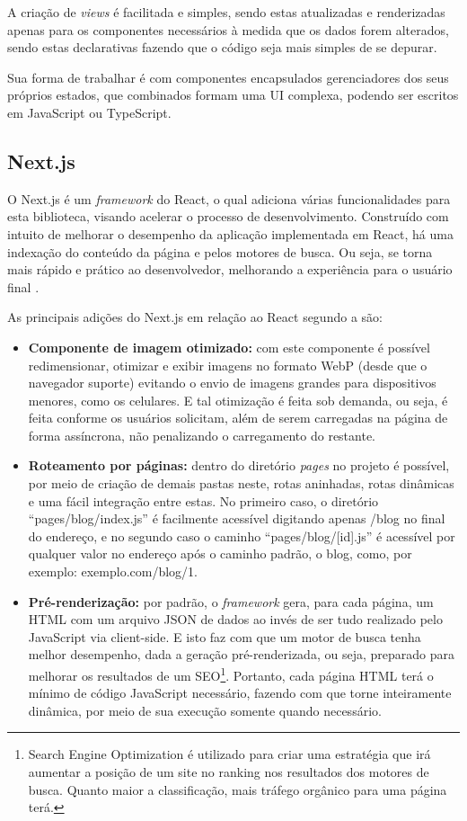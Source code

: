 A criação de \textit{views} é facilitada e simples, sendo estas atualizadas e renderizadas apenas para os componentes necessários à medida que os dados forem alterados, sendo estas declarativas fazendo que o código seja mais simples de se depurar.

Sua forma de trabalhar é com componentes encapsulados gerenciadores dos seus próprios estados, que combinados formam uma UI complexa, podendo ser escritos em JavaScript ou TypeScript.

\subsection{Next.js}
O Next.js é um \textit{framework} do React, o qual adiciona várias funcionalidades para esta biblioteca, visando acelerar o processo de desenvolvimento. Construído com intuito de melhorar o desempenho da aplicação implementada em React, há uma indexação do conteúdo da página e pelos motores de busca. Ou seja, se torna mais rápido e prático ao desenvolvedor, melhorando a experiência para o usuário final \cite{KONSHIN}.

As principais adições do Next.js em relação ao React segundo a  são:
\begin{itemize}
    \item \textbf{Componente de imagem otimizado:} com este componente é possível redimensionar, otimizar e exibir imagens no formato WebP (desde que o navegador suporte) evitando o envio de imagens grandes para dispositivos menores, como os celulares. E tal otimização é feita sob demanda, ou seja, é feita conforme os usuários solicitam, além de serem carregadas na página de forma assíncrona, não penalizando o carregamento do restante.
    \item \textbf{Roteamento por páginas:} dentro do diretório \textit{pages} no projeto é possível, por meio de criação de demais pastas neste, rotas aninhadas, rotas dinâmicas e uma fácil integração entre estas. No primeiro caso, o diretório “pages/blog/index.js” é facilmente acessível digitando apenas /blog no final do endereço, e no segundo caso o caminho “pages/blog/[id].js” é acessível por qualquer valor no endereço após o caminho padrão, o blog, como, por exemplo: exemplo.com/blog/1.
    \item \textbf{Pré-renderização:} por padrão, o \textit{framework} gera, para cada página, um HTML com um arquivo JSON de dados ao invés de ser tudo realizado pelo JavaScript via client-side. E isto faz com que um motor de busca tenha melhor desempenho, dada a geração pré-renderizada, ou seja, preparado para melhorar os resultados de um SEO\footnote{Search Engine Optimization é utilizado para criar uma estratégia que irá aumentar a posição de um site no ranking nos resultados dos motores de busca. Quanto maior a classificação, mais tráfego orgânico para uma página terá.}. Portanto, cada página HTML terá o mínimo de código JavaScript necessário, fazendo com que torne inteiramente dinâmica, por meio de sua execução somente quando necessário.
\end{itemize}

